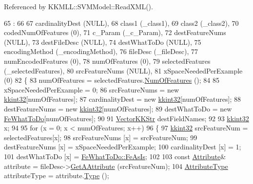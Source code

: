 Referenced by K\+K\+M\+L\+L\+::\+S\+V\+M\+Model\+::\+Read\+X\+M\+L().


\begin{DoxyCode}
65                                 :
66 
67     cardinalityDest          (NULL),
68     class1                   (\_class1),
69     class2                   (\_class2),
70     codedNumOfFeatures       (0),
71     c\_Param                  (\_c\_Param),
72     destFeatureNums          (NULL),
73     destFileDesc             (NULL),
74     destWhatToDo             (NULL),
75     encodingMethod           (\_encodingMethod),
76     fileDesc                 (\_fileDesc),
77     numEncodedFeatures       (0),
78     numOfFeatures            (0),
79     selectedFeatures         (\_selectedFeatures),
80     srcFeatureNums           (NULL),
81     xSpaceNeededPerExample   (0)
82 \{
83   numOfFeatures   = selectedFeatures.\hyperlink{class_k_k_m_l_l_1_1_feature_num_list_af2d974ca245a5d3c2bc88da0fe674493}{NumOfFeatures} ();
84 
85   xSpaceNeededPerExample = 0;
86   srcFeatureNums   = \textcolor{keyword}{new} \hyperlink{namespace_k_k_b_a8fa4952cc84fda1de4bec1fbdd8d5b1b}{kkint32}[numOfFeatures];
87   cardinalityDest  = \textcolor{keyword}{new} \hyperlink{namespace_k_k_b_a8fa4952cc84fda1de4bec1fbdd8d5b1b}{kkint32}[numOfFeatures];
88   destFeatureNums  = \textcolor{keyword}{new} \hyperlink{namespace_k_k_b_a8fa4952cc84fda1de4bec1fbdd8d5b1b}{kkint32}[numOfFeatures];
89   destWhatToDo     = \textcolor{keyword}{new} \hyperlink{namespace_k_k_m_l_l_aa7a52865d78241e93b30731e46f99b43}{FeWhatToDo}[numOfFeatures];
90 
91   \hyperlink{class_k_k_b_1_1_vector_k_k_str}{VectorKKStr}   destFieldNames;
92 
93   \hyperlink{namespace_k_k_b_a8fa4952cc84fda1de4bec1fbdd8d5b1b}{kkint32}  x;
94 
95   \textcolor{keywordflow}{for}  (x = 0;  x < numOfFeatures;  x++)
96   \{
97     \hyperlink{namespace_k_k_b_a8fa4952cc84fda1de4bec1fbdd8d5b1b}{kkint32}  srcFeatureNum = selectedFeatures[x];
98     srcFeatureNums  [x] = srcFeatureNum;
99     destFeatureNums [x] = xSpaceNeededPerExample;
100     cardinalityDest [x] = 1;
101     destWhatToDo    [x] = \hyperlink{namespace_k_k_m_l_l_aa7a52865d78241e93b30731e46f99b43a8fdde05abb9506fd4caa93ddc4490a13}{FeWhatToDo::FeAsIs};
102 
103     \textcolor{keyword}{const} \hyperlink{class_k_k_m_l_l_1_1_attribute}{Attribute}&  attribute = fileDesc->\hyperlink{class_k_k_m_l_l_1_1_file_desc_a3434345c7dff811c0414b20ea9213519}{GetAAttribute} (srcFeatureNum);
104     \hyperlink{namespace_k_k_m_l_l_a99973706982b59debba670e2480555ab}{AttributeType}  attributeType = attribute.\hyperlink{class_k_k_m_l_l_1_1_attribute_ae867c1b4e264fb7be26941730364116d}{Type} ();

\end{DoxyCode}
